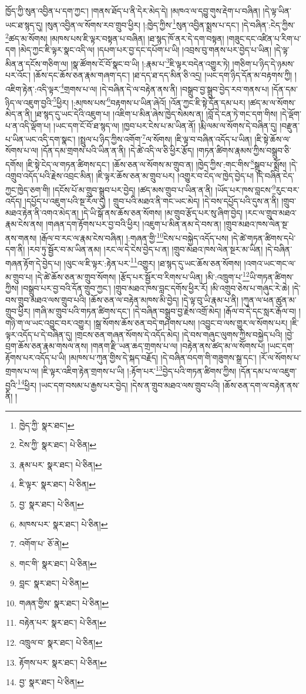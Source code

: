 ཁྱོད་ཀྱི་སུན་འབྱིན་པ་དག་ཀྱང་། །གནས་ཐོད་པ་ནི་དེར་མེད་དེ། །མཁའ་ལ་དབྱུ་གུས་རྡེག་པ་བཞིན། །དེ་ལྟ་ཡིན་ཡང་ཐ་སྙད་དུ། །སུན་འབྱིན་ལ་སོགས་རབ་གྲུབ་ཕྱིར། །:ཁྱེད་ཀྱིས་\footnote{ཁྱེད་ཀྱི་  སྣར་ཐང་། }སུན་འབྱིན་སྨྲས་པ་དང་། །དེ་བཞིན་:ངེད་ཀྱིས་\footnote{ངེས་ཀྱི་  སྣར་ཐང་།  པེ་ཅིན། }ཚད་མ་སོགས། །མཁས་པས་ཇི་ལྟར་བསྟན་པ་བཞིན། །ཐ་སྙད་ཁོ་ནར་དེ་དག་བསྟན། །གཟུང་དང་འཛིན་པ་རིག་པ་དག །མེད་ཀྱང་ཇི་ལྟར་སྣང་འདི་ལ། །དཔག་པར་བྱ་དང་དཔོག་པ་ཡི། །འབྲས་བུ་གནས་པར་བྱེད་པ་ཡིན། །དེ་ལྟ་མིན་ན་དངོས་གཅིག་ལ། །སྣ་ཚོགས་ངོ་བོ་སྣང་བ་ཡི། །:རྣམ་པ་\footnote{རྣམ་པར་  སྣར་ཐང་།  པེ་ཅིན། }ཇི་ལྟར་བདེན་འགྱུར་ཏེ། །གཅིག་པ་ཉིད་དེ་ཉམས་པར་འོང་། །ཆོས་དང་ཆོས་ཅན་རྣམ་གཞག་དང་། །ཐ་དད་ཐ་དད་མིན་ཅི་འདྲ། །ཡང་དག་ཉིད་དོན་མ་བརྟགས་ཀྱི། །འཇིག་རྟེན་:འདི་ལྟར་\footnote{ཇི་ལྟར་  སྣར་ཐང་།  པེ་ཅིན། }གྲགས་པ་ལ། །དེ་བཞིན་དེ་ལ་བརྟེན་ནས་ནི། །བསྒྲུབ་བྱ་སྒྲུབ་བྱེད་རབ་གནས་པ། །དོན་དམ་ཉིད་ལ་འཇུག་བྱའི་\footnote{བྱ་  སྣར་ཐང་།  པེ་ཅིན། }ཕྱིར། །:མཁས་པས་\footnote{མཁས་པར་  སྣར་ཐང་།  པེ་ཅིན། }བརྟགས་པ་ཡིན་ཞེའོ། །འོན་ཀྱང་ཇི་སྟེ་དོན་དམ་པར། །ཚད་མ་ལ་སོགས་མེད་ན་ནི། །ཐ་སྙད་དུ་ཡང་དེའི་འཇུག་པ། །འཇིག་པ་མིན་ཞེས་ཁྱེད་སེམས་ན། །བློ་དེ་ངན་ཏེ་གང་དག་གིས། །དེ་ལྡོག་པ་ན་འདི་ལྡོག་པ། །ཡང་དག་ངོ་བོ་ཐ་སྙད་ལ། །ཁྱབ་པར་ངེས་པ་མ་ཡིན་ནོ། །རྨི་ལམ་ལ་སོགས་དེ་བཞིན་དུ། །བརྫུན་པ་ཡིན་ཡང་འདི་དག་སྣང་། །སྤྲུལ་པ་ཉིད་ཀྱིས་འགོག་\footnote{འགོག་པ་  ཅོ་ནེ། }ལ་སོགས། །ཇི་ལྟ་བ་བཞིན་འདོད་པ་ཡིན། །ཇི་སྟེ་ཆོས་ལ་སོགས་པ་ལ། །དོན་དམ་གྲགས་པའི་ཡིན་ན་ནི། །དེ་ཚེ་འདི་ལ་ཅི་ཕྱིར་རྩོད། །གཏན་ཚིགས་རྣམས་ཀྱིས་བསྒྲུབ་ཅི་དགོས། །ཇི་སྟེ་ངེད་ལ་གཏན་ཚིགས་དང་། །ཆོས་ཅན་ལ་སོགས་མ་གྲུབ་ན། །ཁྱེད་ཀྱིས་:གང་གིས་\footnote{གང་གི་  སྣར་ཐང་།  པེ་ཅིན། }སྒྲུབ་པ་སྨྲོས། །དེ་འགྲུབ་འདོད་པའི་རྗེས་འབྲང་མིན། །ཇི་ལྟར་ཆོས་ཅན་མ་གྲུབ་པར། །འགྱུར་བ་ངེད་ལ་ཁྱེད་བྱེད་པ། །དེ་བཞིན་ངེད་ཀྱང་ཁྱེད་ཅག་གི། །དངོས་པོ་མ་གྲུབ་སྒྲུབ་པར་བྱེད། །ཚད་མས་གྲུབ་པ་ཡིན་ན་ནི། །ཡོད་པར་ཁས་བླངས་\footnote{བླང་  སྣར་ཐང་།  པེ་ཅིན། }རུང་བར་འདོད། །དཔྱོད་པ་འཇུག་པའི་སྔ་རོལ་དུ། །
གྲུབ་པའི་མཐའ་ནི་གང་ཡང་མེད། །དེ་བས་དཔྱོད་པའི་དུས་ན་ནི། །གྲུབ་མཐའ་རྟེན་ནི་འགའ་མེད་ན། །དེ་ཡི་སྒོ་ནས་ཆོས་ཅན་སོགས། །མ་གྲུབ་རྩོད་པར་སུ་ཞིག་བྱེད། །རང་ལ་གྲུབ་མཐའ་རྣམ་ངེས་ནས། །གཞན་དག་རྟོགས་པར་བྱ་བའི་ཕྱིར། །འཇུག་པ་མིན་ནམ་དེ་བས་ན། །གྲུབ་མཐའ་ཁས་ལེན་སྔ་ནས་གནས། །རྒོལ་བ་རང་ལ་རྣམ་ངེས་བཞིན། །:གཞན་གྱི་\footnote{གཞན་གྱིས་  སྣར་ཐང་།  པེ་ཅིན། }ངེས་པ་བསྐྱེད་འདོད་པས། །དེ་ཚེ་གཏན་ཚིགས་དཔེ་དག་ནི། །རབ་ཏུ་སྦྱོར་བ་མ་ཡིན་ནམ། །རང་ལ་དེ་ངེས་བྱེད་པ་ན། །གྲུབ་མཐའ་ཁས་ལེན་སྔར་མ་ཡིན། །དེ་བཞིན་གཞན་རྟོག་དེ་བྱེད་པ། །ལུང་ལ་ཇི་ལྟར་:རྟེན་པར་\footnote{བརྟེན་པར་  སྣར་ཐང་།  པེ་ཅིན། }འགྱུར། །ཐ་སྙད་དུ་ཡང་ཆོས་ཅན་སོགས། །འགའ་ཡང་གང་ལ་མ་གྲུབ་པ། །དེ་ཚེ་ཆོས་ཅན་མ་གྲུབ་སོགས། །རྩོད་པར་སྦྱོར་བ་རིགས་པ་ཡིན། །མི་:འཁྲུག་པ་\footnote{འཁྲུལ་བ་  སྣར་ཐང་།  པེ་ཅིན། }ཡི་གཏན་ཚིགས་ཀྱིས། །བསྒྲུབ་པར་བྱ་བའི་དོན་གྲུབ་ཀྱང་། །གྲུབ་མཐའ་ཁས་བླང་དགོས་ཕྱིར་རོ། །མི་འགྲུབ་ཅེས་པ་གཞུང་རེ་ཆེ། །དེ་བས་གྲུབ་མཐའ་ལས་གྲུབ་པའི། །ཆོས་ཅན་ལ་བརྟེན་མཁས་མི་བྱེད། །དེ་ལྟ་བུ་ཡི་རྣམ་པ་ནི། །ཀུན་ལ་ཕན་ཚུན་མ་གྲུབ་ཕྱིར། །གཞི་མ་གྲུབ་པའི་གཏན་ཚིགས་དང་། །དེ་བཞིན་བསྒྲུབ་བྱ་རྗེས་འགྲོ་མེད། །རྒོལ་བ་དེ་དང་སླར་རྒོལ་བ། །གཉི་ག་ལ་ཡང་འབྱུང་བར་འགྱུར། །སྒྲ་སོགས་ཆོས་ཅན་བདེ་གཤེགས་པས། །འབྱུང་བ་ལས་གྱུར་ལ་སོགས་པར། །ཇི་ལྟར་འདོད་པ་དེ་བཞིན་དུ། །གྲངས་ཅན་གཞན་སོགས་དེ་འདོད་མེད། །དེ་བས་གཞུང་ལུགས་ཀྱིས་བསྐྱེད་པའི། །བྱེ་བྲག་ཆོས་ཅན་རྣམ་གསལ་ནས། །གནག་རྫི་ཡན་ཆད་གྲགས་པ་ལ། །བརྟེན་ནས་ཚད་མ་ལ་སོགས་པ། །ཡང་དག་རྟོགས་པར་འདོད་པ་ཡི། །མཁས་པ་ཀུན་གྱིས་དེ་སྐད་བརྗོད། །དེ་བཞིན་བདག་གི་གཟུགས་སྒྲ་དང་། །རོ་ལ་སོགས་པ་གྲགས་པ་ལ། །ཇི་ལྟར་འཇིག་རྟེན་གྲགས་པ་ཡི། །:རྟོག་པར་\footnote{རྟོགས་པར་  སྣར་ཐང་།  པེ་ཅིན། }བྱེད་པའི་གཏན་ཚིགས་ཀྱིས། །དོན་དམ་པ་ལ་འཇུག་བྱའི་\footnote{བྱ་  སྣར་ཐང་།  པེ་ཅིན། }ཕྱིར། །ཡང་དག་བསམ་པ་རྒྱས་པར་བྱེད། །དེས་ན་གྲུབ་མཐའ་ལས་གྲུབ་པའི། །ཆོས་ཅན་དག་ལ་བརྟེན་ནས་ནི། །
